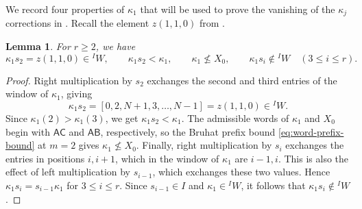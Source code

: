 \documentclass[11pt,a4paper,reqno]{amsart}
\numberwithin{equation}{section}
\newtheorem{lemma}[theorem]{Lemma}
\theoremstyle{definition}
\theoremstyle{remark}
\theoremstyle{plain}
\newcommand{\A}{\mathsf A}
\newcommand{\B}{\mathsf B}
\newcommand{\CC}{\mathsf C}
\begin{document}
{\color{black}
We record four properties of $\kappa_1$ that will be used to prove the vanishing of the $\kappa_j$ corrections in .
Recall the element $z(1,1,0)$ from .

\begin{lemma}
\label{lem:kappa-basic-properties}
For $r\geq2$, we have
\[
\kappa_1s_2=z(1,1,0)\in{}^IW,\qquad
\kappa_1s_2<\kappa_1,\qquad
\kappa_1\not\leq X_0,\qquad
\kappa_1s_i\notin{}^I W\quad(3\leq i\leq r).
\]
\end{lemma}

\begin{proof}
Right multiplication by $s_2$ exchanges the second and third
entries of the window of $\kappa_1$, giving
\[
\kappa_1s_2=[0,2,N+1,3,\ldots,N-1]=z(1,1,0)\in{}^IW.
\]
Since $\kappa_1(2)>\kappa_1(3)$, we get $\kappa_1s_2<\kappa_1$.
The admissible words of $\kappa_1$ and $X_0$ begin with $\A\CC$ and $\A\B$, respectively, so the Bruhat prefix bound \eqref{eq:word-prefix-bound} at $m=2$ gives $\kappa_1\not\leq X_0$.
Finally, right multiplication by $s_i$ exchanges the entries in
positions $i,i+1$, which in the window of $\kappa_1$ are $i-1,i$.
This is also the effect of left multiplication by $s_{i-1}$,
which exchanges these two values. Hence
$\kappa_1s_i=s_{i-1}\kappa_1$ for $3\leq i\leq r$.
Since $s_{i-1}\in I$ and $\kappa_1\in{}^I W$,
it follows that $\kappa_1s_i\notin{}^I W$.
\end{proof}
}
\end{document}
